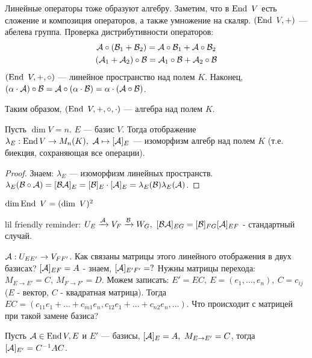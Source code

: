 \documentclass[main]{subfiles}
\begin{document}
Линейные операторы тоже образуют алгебру. Заметим, что в $\operatorname{End} \ V$ есть сложение и композиция операторов, а также умножение на скаляр. 
$(\operatorname{End} \ V, +)$ — абелева группа. Проверка дистрибутивности операторов:
\begin{gather*}
    \mathcal{A}\circ(\mathcal{B}_1+\mathcal{B}_2) = \mathcal{A}\circ\mathcal{B}_1 + \mathcal{A}\circ\mathcal{B}_2 \\
    (\mathcal{A}_1 + \mathcal{A}_2)\circ\mathcal{B} = \mathcal{A}_1\circ\mathcal{B}+\mathcal{A}_2\circ\mathcal{B}
\end{gather*}
$(\operatorname{End} \ V, +, \circ)$ — линейное пространство над полем $K$. Наконец,
$(\alpha\cdot\mathcal{A})\circ\mathcal{B}=\mathcal{A}\circ(\alpha\cdot\mathcal{B})=\alpha\cdot(\mathcal{A}\circ\mathcal{B})$.
 
Таким образом, $(\operatorname{End} \ V, +, \circ, \cdot)$ — алгебра над полем $K$.




\begin{proposition}
Пусть $\dim V = n$. $E$ — базис $V$. 
Тогда отображение $\lambda_E : \operatorname{End} V \rightarrow M_n(K), \ \mathcal{A} \mapsto [\mathcal{A}]_E$ — изоморфизм алгебр над полем $K$ (т.е. биекция, сохраняющая все операции).
\end{proposition}

\begin{proof}
    Знаем: $\lambda_E$ — изоморфизм линейных пространств. $\lambda_E(\mathcal{B}\circ\mathcal{A})=[\mathcal{B}\mathcal{A}]_E=[\mathcal{B}]_E\cdot[\mathcal{A}]_E = \lambda_E(\mathcal{B})\lambda_E(\mathcal{A})$.
\end{proof}

\begin{corollary}
$\dim \operatorname{End}\ V = (\dim \ V)^2 $
\end{corollary}

lil friendly reminder: $U_E \xrightarrow{\mathcal{A}} V_F \xrightarrow{\mathcal{B}} W_G,\  
[\mathcal{B}\mathcal{A}]_{EG} = [\mathcal{B}]_{FG}[\mathcal{A}]_{EF}
$ - стандартный случай. 
    
$\mathcal{A}: U_{EE'} \rightarrow V_{FF'}$. Как связаны матрицы этого линейного отображения в двух базисах?
$[\mathcal{A}]_{EF}=A$ - знаем,  $[\mathcal{A}]_{E'F'}=?$ Нужны матрицы перехода:
$M_{E\rightarrow E'} = C,\ M_{F\rightarrow F'} = D$. Можем записать:
$E' = EC,\ E=(e_1, \ldots ,e_n),\ C=c_{ij}$ ($E$ - вектор, $C$ - квадратная матрица). Тогда
$EC=(c_{11}e_1+\ldots+c_{m1}e_n, c_{12}e_1 +\ldots +c_{n2}e_n, \ldots)$. Что происходит с матрицей при такой замене базиса?

\begin{proposition} 
    Пусть $\mathcal{A} \in \operatorname{End} V, E$ и $E'$ — базисы, $[\mathcal{A}]_{E}=A,\ M_{E\rightarrow E'}=C$, тогда $[\mathcal{A}]_{E'}=C^{-1}AC$.
\end{proposition}
\end{document}
